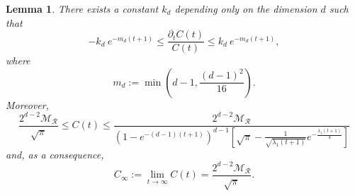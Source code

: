 \documentclass[12pt,longbibliography]{article}
\newtheorem{lem}[thm]{Lemma}
\theoremstyle{definition}
\theoremstyle{remark}
\theoremstyle{example}
\begin{document}
\begin{lem}\label{lem:constant_C(t)}
	There exists a constant $k_d$ depending only on the dimension $d$ such that
	\begin{equation*}
		-k_d\  e^{-m_d (t+1)}\leq \frac{\partial_t C(t)}{C(t)}\leq k_d\  e^{-m_d (t+1)},
	\end{equation*}
	where
	\[
	m_d := \min \left(d-1, \frac{(d-1)^2}{16}\right).
	\]
	Moreover,
	\begin{equation*}
		\frac{2^{d-2}\mathcal{M}_{\mathcal{R}}}{\sqrt{\pi} }\leq C(t)\leq \frac{2^{d-2}\mathcal{M}_{\mathcal{R}}}{(1-e^{-(d-1)(t+1)})^{d-1}\left[\sqrt{\pi} - \frac{1}{\sqrt{\lambda_1 (t+1)}}e^{-\frac{\lambda_1 (t+1)}{4}}\right]}
	\end{equation*}
	and, as a consequence,
	\[
	C_\infty:=\lim\limits_{t\to\infty} C(t) = \frac{2^{d-2}\mathcal{M}_{\mathcal{R}}}{\sqrt{\pi} }.
	\]
\end{lem}
\end{document}
